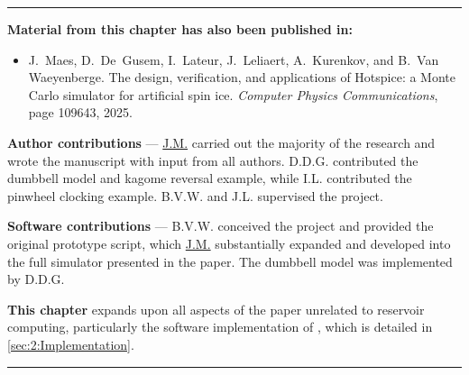 \newpage
\vspace*{\fill}
\begin{adjustwidth}{2em}{2em}
	\vspace{0em}
	\begin{center}
		\centering\rule{0.75\linewidth}{0.4pt}
	\end{center}
	\vspace{0em}
	\begin{center}
		\textbf{Material from this chapter has also been published in:} \\
	\end{center}
	\vspace{0em}
	\begin{adjustwidth}{0em}{1.5em}
		\begin{itemize}
			\item[\cite{MAES-24}] J.~Maes, D.~De~Gusem, I.~Lateur, J.~Leliaert, A.~Kurenkov, and B.~Van Waeyenberge.
			\newblock The design, verification, and applications of Hotspice: a Monte Carlo simulator for artificial spin ice.
			\newblock \emph{Computer Physics Communications}, page 109643, 2025.
		\end{itemize}
	\end{adjustwidth}
	\vspace{1em}
	\begin{adjustwidth}{0.125\linewidth}{0.125\linewidth}
		\textbf{Author contributions} ---
		\underline{J.M.} carried out the majority of the research and wrote the manuscript with input from all authors.
		D.D.G. contributed the dumbbell model and kagome reversal example, while I.L. contributed the pinwheel clocking example.
		B.V.W. and J.L. supervised the project.	\par
		
		\vspace{1em}
		\textbf{Software contributions} ---
		B.V.W. conceived the \hotspice project and provided the original prototype script, which \underline{J.M.} substantially expanded and developed into the full simulator presented in the paper.
		The dumbbell model was implemented by D.D.G. \par
		
		\vspace{1em}
		\textbf{This chapter} expands upon all aspects of the paper unrelated to reservoir computing, particularly the software implementation of \hotspice, which is detailed in \cref{sec:2:Implementation}.
	\end{adjustwidth}
	\vspace{-0.5em}
	\begin{center}
		\centering\rule{0.75\linewidth}{0.4pt}
	\end{center}
\end{adjustwidth}
\vspace*{\fill}


